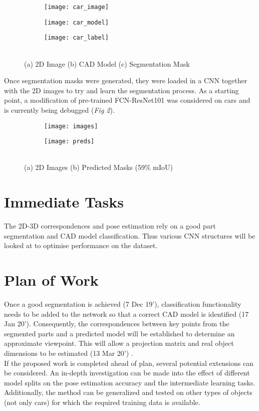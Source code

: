 \documentclass[11pt,a4paper]{article}
\begin{document}
\begin{figure}[h!]
\centering
\begin{subfigure}[c]{0.2\textwidth}
\centering
\texttt{[image: car\_image]}
\caption{}
\end{subfigure}%
\begin{subfigure}[c]{0.22\textwidth}
\centering
\texttt{[image: car\_model]}
\caption{}
\end{subfigure}%
\begin{subfigure}[c]{0.2\textwidth}
\centering
\texttt{[image: car\_label]}
\caption{}
\end{subfigure}%
\caption{\\ (a) 2D Image (b) CAD Model (c) Segmentation Mask}
\end{figure}

Once segmentation masks were generated, they were loaded in a CNN together with the 2D images to try and learn the segmentation process. As a starting point, a modification of pre-trained FCN-ResNet101 was considered on cars and is currently being debugged (\emph{Fig 2}).

\begin{figure}[h!]
\centering
\begin{subfigure}[c]{0.4\textwidth}
\centering
\texttt{[image: images]}
\caption{}
\end{subfigure}%
\begin{subfigure}[c]{0.4\textwidth}
\centering
\texttt{[image: preds]}
\caption{}
\end{subfigure}%
\caption{\\ (a) 2D Images (b) Predicted Masks (59\% mIoU)}
\end{figure}

\section{Immediate Tasks}
The 2D-3D correspondences and pose estimation rely on a good part segmentation and CAD model classification. Thus various CNN structures will be looked at to optimise performance on the dataset.

\section{Plan of Work}
Once a good segmentation is achieved (7 Dec 19'), classification functionality needs to be added to the network so that a correct CAD model is identified (17 Jan 20'). Consequently, the correspondences between key points from the segmented parts and a predicted model will be established to determine an approximate viewpoint. This will allow a projection matrix and real object dimensions to be estimated (13 Mar 20') .\\
If the proposed work is completed ahead of plan, several potential extensions can be considered. An in-depth investigation can be made into the effect of different model splits on the pose estimation accuracy and the intermediate learning tasks. Additionally, the method can be generalized and tested on other types of objects (not only cars) for which the required training data is available.
\end{document}
